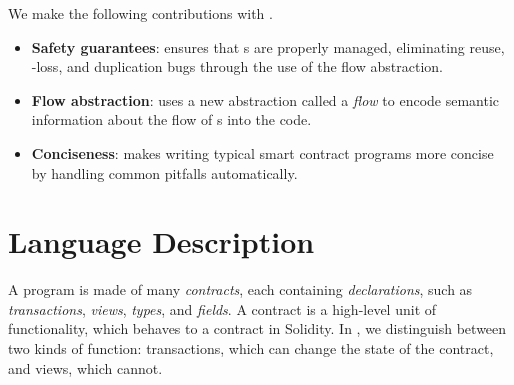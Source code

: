 \documentclass[dvipsnames, usenames, sigconf]{acmart}
\begin{document}
We make the following contributions with \langName.
\begin{itemize}
    \item \textbf{Safety guarantees}: \langName ensures that \assetTxt{}s are properly managed, eliminating reuse, \assetTxt-loss, and duplication bugs through the use of the flow abstraction.

    \item \textbf{Flow abstraction}: \langName uses a new abstraction called a \emph{flow} to encode semantic information about the flow of \assetTxt{}s into the code.

    \item \textbf{Conciseness}: \langName makes writing typical smart contract programs more concise by handling common pitfalls automatically.
\end{itemize}



\section{Language Description}

A \langName program is made of many \emph{contracts}, each containing \emph{declarations}, such as \emph{transactions}, \emph{views}, \emph{types}, and \emph{fields}.
A contract is a high-level unit of functionality, which behaves  to a contract in Solidity.
In \langName, we distinguish between two kinds of function: transactions, which can change the state of the contract, and views, which cannot.
\end{document}
